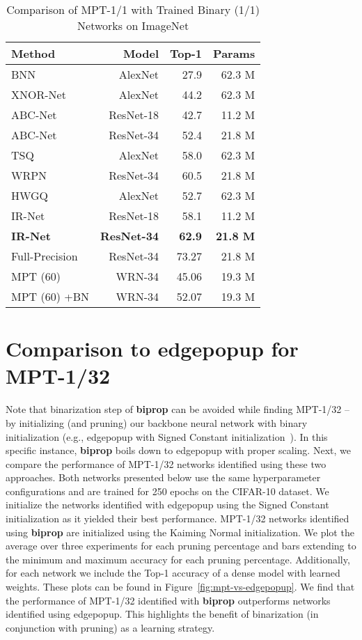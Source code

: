 \documentclass{article} \usepackage{iclr2021_conference,times}
\begin{document}
\begin{table*}[!t] 
\centering
\begin{small}
\begin{tabular}{@{}lrrr@{}}\toprule
\textbf{Method} & \textbf{Model} & \textbf{Top-1} & \textbf{Params} \\ \midrule
BNN & AlexNet & 27.9 & 62.3 M \\ \hdashline
XNOR-Net & AlexNet & 44.2 & 62.3 M\\ \hdashline
ABC-Net & ResNet-18 & 42.7 & 11.2 M \\ \hdashline
ABC-Net & ResNet-34 & 52.4 & 21.8 M \\ \hdashline
TSQ & AlexNet & 58.0 & 62.3 M\\ \hdashline
WRPN & ResNet-34 & 60.5 & 21.8 M \\ \hdashline
HWGQ & AlexNet & 52.7 & 62.3 M\\ \hdashline
IR-Net & ResNet-18 & 58.1 & 11.2 M \\ \hdashline
\textbf{IR-Net} & \textbf{ResNet-34} & \textbf{62.9} & \textbf{21.8 M} \\ \hdashline
Full-Precision & ResNet-34 & 73.27& 21.8 M\\ \hline
MPT (60) & WRN-34 & 45.06 & 19.3 M \\ \hdashline
MPT (60) +BN & WRN-34 & 52.07 & 19.3 M \\
\bottomrule
\end{tabular}
\end{small}
\caption{Comparison of MPT-1/1 with Trained Binary (1/1) Networks on ImageNet}
\label{table:app-imagenet-mpt-1-1}
\end{table*}


\section{Comparison to edgepopup for MPT-1/32}
\label{sec:mpt-vs-edgepopup}
Note that binarization step of \textbf{biprop} can be avoided while finding MPT-1/32 -- by initializing (and pruning) our backbone neural network with binary initialization (e.g., edgepopup with Signed Constant initialization~\citep{ramanujan2019whats}). In this specific instance, \textbf{biprop} boils down to edgepopup with proper scaling. Next, we compare the performance of MPT-1/32 networks identified using these two approaches. 
Both networks presented below use the same hyperparameter configurations and are trained for 250 epochs on the CIFAR-10 dataset. We initialize the networks identified with edgepopup using the Signed Constant initialization as it yielded their best performance. MPT-1/32 networks identified using \textbf{biprop} are initialized using the Kaiming Normal initialization. We plot the average over three experiments for each pruning percentage and bars extending to the minimum and maximum accuracy for each pruning percentage. Additionally, for each network we include the Top-1 accuracy of a dense model with learned weights. These plots can be found in Figure~\ref{fig:mpt-vs-edgepopup}. We find that the performance of MPT-1/32 identified with \textbf{biprop} outperforms networks identified using edgepopup. This highlights the benefit of binarization (in conjunction with pruning) as a learning strategy.  
\end{document}
